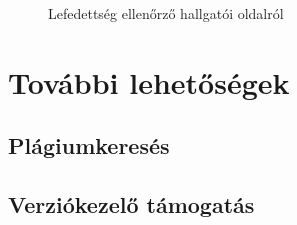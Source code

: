 \begin{figure}[h]
    \centering
    \caption{Lefedettség ellenőrző hallgatói oldalról}
    \label{fig:jporta_codecov_result2}
\end{figure} 



\section{További lehetőségek}

\subsection{Plágiumkeresés}

\subsection{Verziókezelő támogatás}